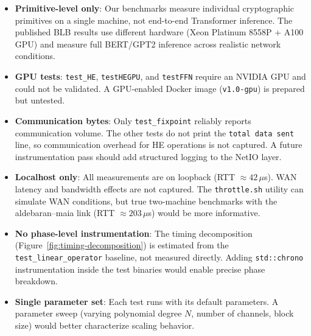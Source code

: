 \begin{itemize}[nosep]
  \item \textbf{Primitive-level only}: Our benchmarks measure individual cryptographic primitives on a single machine, not end-to-end Transformer inference. The published BLB results use different hardware (Xeon Platinum 8558P + A100 GPU) and measure full BERT/GPT2 inference across realistic network conditions.
  \item \textbf{GPU tests}: \texttt{test\_HE}, \texttt{testHEGPU}, and \texttt{testFFN} require an NVIDIA GPU and could not be validated. A GPU-enabled Docker image (\texttt{v1.0-gpu}) is prepared but untested.
  \item \textbf{Communication bytes}: Only \texttt{test\_fixpoint} reliably reports communication volume. The other tests do not print the \texttt{total data sent} line, so communication overhead for HE operations is not captured. A future instrumentation pass should add structured logging to the NetIO layer.
  \item \textbf{Localhost only}: All measurements are on loopback (RTT $\approx 42\,\mu$s). WAN latency and bandwidth effects are not captured. The \texttt{throttle.sh} utility can simulate WAN conditions, but true two-machine benchmarks with the aldebaran--maia link (RTT $\approx 203\,\mu$s) would be more informative.
  \item \textbf{No phase-level instrumentation}: The timing decomposition (Figure~\ref{fig:timing-decomposition}) is estimated from the \texttt{test\_linear\_operator} baseline, not measured directly. Adding \texttt{std::chrono} instrumentation inside the test binaries would enable precise phase breakdown.
  \item \textbf{Single parameter set}: Each test runs with its default parameters. A parameter sweep (varying polynomial degree $N$, number of channels, block size) would better characterize scaling behavior.
\end{itemize}
